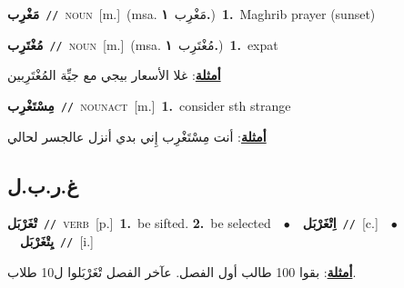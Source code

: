 \documentclass[10pt,a4paper,twoside]{article} %
\begin{document}
\begin{multicols}{2}
{\setlength\topsep{0pt}\textbf{\foreignlanguage{arabic}{مَغْرِب}}\ {\color{gray}\texttt{//}\color{black}}\ \textsc{noun}\ [m.]\ \color{gray}(msa. \foreignlanguage{arabic}{مَغْرِب}~\foreignlanguage{arabic}{\textbf{١.}})\color{black}\ \textbf{1.}~Maghrib prayer (sunset)\ } \vspace{2mm}

{\setlength\topsep{0pt}\textbf{\foreignlanguage{arabic}{مُغْتَرِب}}\ {\color{gray}\texttt{//}\color{black}}\ \textsc{noun}\ [m.]\ \color{gray}(msa. \foreignlanguage{arabic}{مُغْتَرِب}~\foreignlanguage{arabic}{\textbf{١.}})\color{black}\ \textbf{1.}~expat\  \begin{flushright}\color{gray}\foreignlanguage{arabic}{\textbf{\underline{\foreignlanguage{arabic}{أمثلة}}}: غلا الأسعار بيجي مع جيِّة المُغْتَرِبين}\end{flushright}\color{black}} \vspace{2mm}

{\setlength\topsep{0pt}\textbf{\foreignlanguage{arabic}{مِسْتَغْرِب}}\ {\color{gray}\texttt{//}\color{black}}\ \textsc{noun\textunderscore act}\ [m.]\ \textbf{1.}~consider sth strange\  \begin{flushright}\color{gray}\foreignlanguage{arabic}{\textbf{\underline{\foreignlanguage{arabic}{أمثلة}}}: أنت مِسْتَغْرِب إِني بدي أنزل عالجسر لحالي}\end{flushright}\color{black}} \vspace{2mm}

\vspace{-3mm}
\subsection*{\color{blue}\foreignlanguage{arabic}{غ.ر.ب.ل}\color{blue}{}} 

{\setlength\topsep{0pt}\textbf{\foreignlanguage{arabic}{تْغَرْبَل}}\ {\color{gray}\texttt{//}\color{black}}\ \textsc{verb}\ [p.]\ \textbf{1.}~be sifted.  \textbf{2.}~be selected\ \ $\bullet$\ \ \setlength\topsep{0pt}\textbf{\foreignlanguage{arabic}{اِتْغَرْبَل}}\ {\color{gray}\texttt{//}\color{black}}\ [c.]\ \ $\bullet$\ \ \setlength\topsep{0pt}\textbf{\foreignlanguage{arabic}{يِتْغَرْبَل}}\ {\color{gray}\texttt{//}\color{black}}\ [i.]\  \begin{flushright}\color{gray}\foreignlanguage{arabic}{\textbf{\underline{\foreignlanguage{arabic}{أمثلة}}}: بقوا 100 طالب أول الفصل. عآخر الفصل تْغَرْبَلوا ل10 طلاب.}\end{flushright}\color{black}} \vspace{2mm}


\end{multicols}
\end{document}
